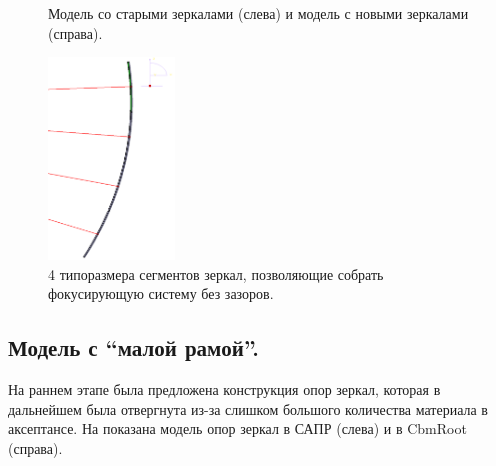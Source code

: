 \begin{figure}[H]
\begin{minipage}[b]{0.495\textwidth}
\end{minipage}
\caption{Модель со старыми зеркалами (слева) и модель с новыми зеркалами (справа).}
\label{fig:MCgeoMirrorsEvolution}
\end{figure}

\begin{figure}[H]
\centering
\includegraphics[width=0.3\textwidth]{pictures/Mirrors_4types_of_segments.png}
\caption{4 типоразмера сегментов зеркал, позволяющие собрать фокусирующую систему без зазоров.}
\label{fig:Mirrors4types}
\end{figure}

\subsection{Модель с ``малой рамой''.}\label{sec:secModelWithSmallFrame}

На раннем этапе была предложена конструкция опор зеркал, которая в дальнейшем была отвергнута из-за слишком большого количества материала в аксептансе. На  показана модель опор зеркал в САПР (слева) и в CbmRoot (справа).


